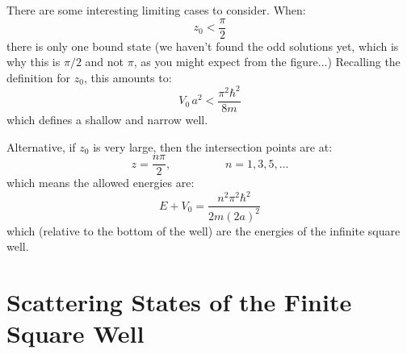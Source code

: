 \documentclass[12pt]{book}
\begin{document}
There are some interesting limiting cases to consider.  When:
$$z_0 < \frac{\pi}{2}$$
there is only one bound state (we haven't found the odd solutions yet, which is why this is $\pi/2$ and not $\pi$, as you might expect from the figure...)  Recalling the definition for $z_0$, this amounts to:
$$V_0\,a^2 < \frac{\pi^2 \hbar^2}{8m}$$
which defines a shallow and narrow well.

Alternative, if $z_0$ is very large, then the intersection points are at:
$$z = \frac{n\pi}{2}, \hspace{2cm} n=1,3,5,\ldots$$
which means the allowed energies are:
$$E + V_0 = \frac{n^2\pi^2\hbar^2}{2m(2a)^2}$$
which (relative to the bottom of the well) are the energies of the infinite square well.

\section{Scattering States of the Finite Square Well}
\end{document}
